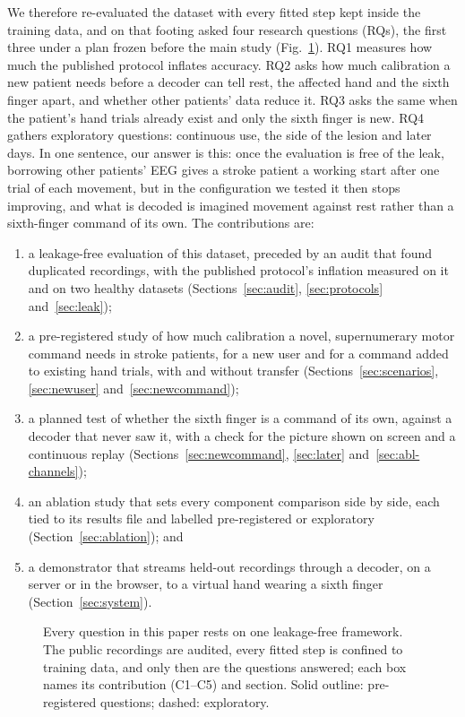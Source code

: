 We therefore re-evaluated the dataset with every fitted step kept inside the training data, and
on that footing asked four research questions (RQs), the first three under a plan frozen before
the main study (Fig.~\ref{fig:overview}). RQ1 measures how much the published protocol inflates
accuracy. RQ2 asks how much calibration a new patient needs before a decoder can tell rest, the
affected hand and the sixth finger apart, and whether other patients' data reduce it. RQ3 asks
the same when the patient's hand trials already exist and only the sixth finger is new. RQ4
gathers exploratory questions: continuous use, the side of the lesion and later days. In one
sentence, our answer is this: once the evaluation is free of the leak, borrowing other patients'
EEG gives a stroke patient a working start after one trial of each movement, but in the
configuration we tested it then stops improving, and what is decoded is imagined movement
against rest rather than a sixth-finger command of its own. The contributions are:
\begin{enumerate}
  \item[C1] a leakage-free evaluation of this dataset, preceded by an audit that found
        duplicated recordings, with the published protocol's inflation measured on it and on
        two healthy datasets (Sections~\ref{sec:audit}, \ref{sec:protocols} and~\ref{sec:leak});
  \item[C2] a pre-registered study of how much calibration a novel, supernumerary motor command
        needs in stroke patients, for a new user and for a command added to existing hand
        trials, with and without transfer (Sections~\ref{sec:scenarios}, \ref{sec:newuser}
        and~\ref{sec:newcommand});
  \item[C3] a planned test of whether the sixth finger is a command of its own, against a
        decoder that never saw it, with a check for the picture shown on screen and a
        continuous replay (Sections~\ref{sec:newcommand}, \ref{sec:later}
        and~\ref{sec:abl-channels});
  \item[C4] an ablation study that sets every component comparison side by side, each tied to
        its results file and labelled pre-registered or exploratory
        (Section~\ref{sec:ablation}); and
  \item[C5] a demonstrator that streams held-out recordings through a decoder, on a server or
        in the browser, to a virtual hand wearing a sixth finger (Section~\ref{sec:system}).
\end{enumerate}

\begin{figure}[!t]
  \centering
  
  \caption{Every question in this paper rests on one leakage-free framework. The public
  recordings are audited, every fitted step is confined to training data, and only then are the
  questions answered; each box names its contribution (C1--C5) and section. Solid outline:
  pre-registered questions; dashed: exploratory.}
  \label{fig:overview}
\end{figure}
